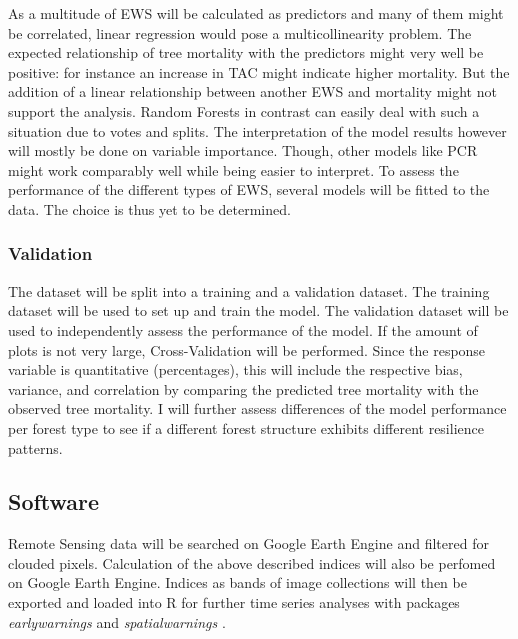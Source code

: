 As a multitude of EWS will be calculated as predictors and many of them might be correlated, linear regression would pose a multicollinearity problem. The expected relationship of tree mortality with the predictors might very well be positive: for instance an increase in TAC might indicate higher mortality. But the addition of a linear relationship between another EWS and mortality might not support the analysis. Random Forests in contrast can easily deal with such a situation due to votes and splits. The interpretation of the model results however will mostly be done on variable importance. Though, other models like PCR might work comparably well while being easier to interpret. To assess the performance of the different types of EWS, several models will be fitted to the data. The choice is thus yet to be determined.\\



\subsubsection{Validation}
The dataset will be split into a training and a validation dataset. The training dataset will be used to set up and train the model. The validation dataset will be used to independently assess the performance of the model. If the amount of plots is not very large, Cross-Validation will be performed. Since the response variable is quantitative (percentages), this will include the respective bias, variance, and correlation by comparing the predicted tree mortality with the observed tree mortality. I will further assess differences of the model performance per forest type to see if a different forest structure exhibits different \gls{resilience} patterns.\\




\subsection{Software}
Remote Sensing data will be searched on Google Earth Engine and filtered for clouded pixels. Calculation of the above described indices will also be perfomed on Google Earth Engine. Indices as bands of image collections will then be exported and loaded into R for further time series analyses with packages \textit{earlywarnings} \citep{earlywarnr} and \textit{spatialwarnings} \citep{spwarnr}.

